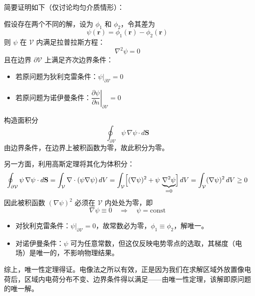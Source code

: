\begin{prove}
    简要证明如下（仅讨论均匀介质情形）：

    假设存在两个不同的解，设为 $\phi_1$ 和 $\phi_2$，令其差为
    \[\psi(\mathbf{r}) = \phi_1(\mathbf{r}) - \phi_2(\mathbf{r})\]
    则 $\psi$ 在 $\mathcal{V}$ 内满足拉普拉斯方程：
    \[\nabla^2 \psi = 0\]
    且在边界 $\partial\mathcal{V}$ 上满足齐次边界条件：
    \begin{itemize}
        \item 若原问题为狄利克雷条件：$\psi|_{\partial\mathcal{V}} = 0$
        \item 若原问题为诺伊曼条件：$\left.\dfrac{\partial\psi}{\partial n}\right|_{\partial\mathcal{V}} = 0$
    \end{itemize}

    构造面积分
    \[\oint_{\partial\mathcal{V}} \psi\,\nabla\psi \cdot d\mathbf{S}\]
    由边界条件，在边界上被积函数为零，故此积分为零。

    另一方面，利用高斯定理将其化为体积分：
    \[
    \oint_{\partial\mathcal{V}} \psi\,\nabla\psi \cdot d\mathbf{S} 
    = \int_{\mathcal{V}} \nabla\cdot(\psi\nabla\psi)\,dV 
    = \int_{\mathcal{V}} \Bigl[(\nabla\psi)^2 + \psi\,\underbrace{\nabla^2\psi}_{=0}\Bigr]\,dV
    = \int_{\mathcal{V}} (\nabla\psi)^2\,dV \geq 0
    \]
    因此被积函数 $(\nabla\psi)^2$ 必须在 $\mathcal{V}$ 内处处为零，即
    \[\nabla\psi \equiv 0 \quad\Rightarrow\quad \psi = \mathrm{const}\]

    \begin{itemize}
        \item 对狄利克雷条件：$\psi|_{\partial\mathcal{V}}=0$，故常数必为零，$\phi_1\equiv\phi_2$，解唯一。
        \item 对诺伊曼条件：$\psi$ 可为任意常数，但这仅反映电势零点的选取，其梯度（电场）是唯一的，不影响物理结果。
    \end{itemize}

    综上，唯一性定理得证。电像法之所以有效，正是因为我们在求解区域外放置像电荷后，区域内电荷分布不变、边界条件得以满足——由唯一性定理，该解即原问题的唯一解。
\end{prove}

